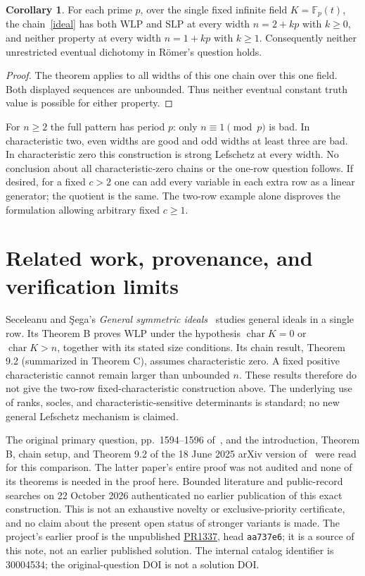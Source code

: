 \documentclass[11pt]{article}
\theoremstyle{definition}
\newtheorem{corollary}[theorem]{Corollary}
\newcommand{\WLP}{\mathrm{WLP}}
\newcommand{\SLP}{\mathrm{SLP}}
\begin{document}
\begin{corollary}
For each prime $p$, over the single fixed infinite field $K=\mathbb F_p(t)$,
the chain~\eqref{ideal} has both $\WLP$ and $\SLP$ at every width
$n=2+kp$ with $k\geq0$, and neither property at every width
$n=1+kp$ with $k\geq1$. Consequently neither unrestricted eventual
dichotomy in R\"omer's question holds.
\end{corollary}
\begin{proof}
The theorem applies to all widths of this one chain over this one field.
Both displayed sequences are unbounded. Thus neither eventual constant
truth value is possible for either property.
\end{proof}
For $n\geq2$ the full pattern has period $p$: only $n\equiv1\pmod p$
is bad. In characteristic two, even widths are good and odd widths
at least three are bad. In characteristic zero this construction is strong
Lefschetz at every width. No conclusion about all characteristic-zero
chains or the one-row question follows. If desired, for a fixed $c>2$
one can add every variable in each extra row as a linear generator;
the quotient is the same. The two-row example alone disproves the
formulation allowing arbitrary fixed $c\geq1$.

\section{Related work, provenance, and verification limits}
Seceleanu and \c Sega's \emph{General symmetric ideals}~\cite{ss}
studies general ideals in a single row. Its Theorem B proves $\WLP$
under the hypothesis $\operatorname{char}K=0$ or
$\operatorname{char}K>n$, together with its stated size conditions.
Its chain result, Theorem 9.2 (summarized in Theorem C), assumes
characteristic zero. A fixed positive characteristic cannot remain larger
than unbounded $n$. These results therefore do not give the two-row
fixed-characteristic construction above. The underlying use of ranks,
socles, and characteristic-sensitive determinants is standard; no new
general Lefschetz mechanism is claimed.

The original primary question, pp.~1594--1596 of~\cite{romer}, and
the introduction, Theorem B, chain setup, and Theorem 9.2 of the
18 June 2025 arXiv version of~\cite{ss} were read for this comparison.
The latter paper's entire proof was not audited and none of its theorems
is needed in the proof here. Bounded literature and public-record searches
on 22 October 2026 authenticated no earlier publication of this exact
construction. This is not an exhaustive novelty or exclusive-priority
certificate, and no claim about the present open status of stronger
variants is made. The project's earlier proof is the unpublished
\href{https://github.com/AlecKriebel/Math/pull/1337}{PR1337},
head \texttt{aa737e6}; it is a source of this note, not an earlier
published solution. The internal catalog identifier is 30004534;
the original-question DOI is not a solution DOI.
\end{document}
